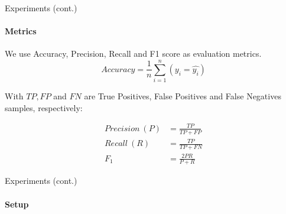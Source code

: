 \begin{frame}{Experiments (cont.)}
\framesubtitle{Metrics}

We use Accuracy, Precision, Recall and F1 score as evaluation metrics.
\begin{equation}
Accuracy  = \displaystyle\frac{1}{n}\sum_{i = 1}^n (y_i = \hat{y_i})
\end{equation}

With $TP, FP$ and $FN$ are True Positives, False Positives and False Negatives samples, respectively:

\begin{equation}
\begin{aligned}
Precision\ (P) &= \frac{TP}{TP + FP} \\
Recall\ (R) &= \frac{TP}{TP + FN} \\
F_{1} &= \frac{2PR}{P + R}    
\end{aligned}
\end{equation}
\end{frame}

\begin{frame}{Experiments (cont.)}
\framesubtitle{Setup}
\end{frame}

